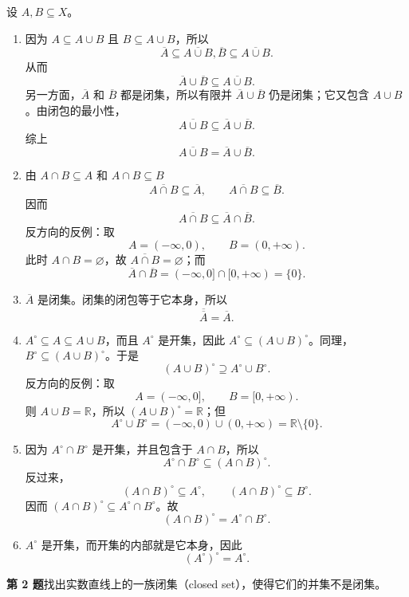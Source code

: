\documentclass[UTF8,a4paper,11pt,fontset=windows]{ctexart}
\newcommand{\R}{\mathbb R}
\newcommand{\problem}[1]{\par\addvspace{10pt}\textbf{第 #1 题}\quad}
\begin{document}
设 $A,B\subseteq X$。
\begin{enumerate}
  \item 因为 $A\subseteq A\cup B$ 且 $B\subseteq A\cup B$，所以
    \[
    \overline A\subseteq\overline{A\cup B},\overline B\subseteq\overline{A\cup B}.
  \]
  从而
  \[
    \overline A\cup\overline B\subseteq\overline{A\cup B}.
  \]
  另一方面，$\overline A$ 和 $\overline B$ 都是闭集，所以有限并 $\overline A\cup\overline B$ 仍是闭集；它又包含 $A\cup B$。由闭包的最小性，
  \[
    \overline{A\cup B}\subseteq\overline A\cup\overline B.
  \]
综上
  \[
    \overline{A\cup B}=\overline A\cup\overline B.
  \]

  \item 由 $A\cap B\subseteq A$ 和 $A\cap B\subseteq B$
  \[
    \overline{A\cap B}\subseteq\overline A,
    \qquad
    \overline{A\cap B}\subseteq\overline B.
  \]
  因而
  \[
    \overline{A\cap B}\subseteq\overline A\cap\overline B.
  \]
反方向的反例：取
  \[
    A=(-\infty,0),\qquad B=(0,+\infty).
  \]
  此时 $A\cap B=\varnothing$，故 $\overline{A\cap B}=\varnothing$；而
  \[
    \overline A\cap\overline B=(-\infty,0]\cap[0,+\infty)=\{0\}.
  \]

  \item $\overline A$ 是闭集。闭集的闭包等于它本身，所以
  \[
    \overline{\overline A}=\overline A.
  \]

  \item $A^\circ\subseteq A\subseteq A\cup B$，而且 $A^\circ$ 是开集，因此 $A^\circ\subseteq(A\cup B)^\circ$。同理，$B^\circ\subseteq(A\cup B)^\circ$。于是
  \[
    (A\cup B)^\circ\supseteq A^\circ\cup B^\circ.
  \]
反方向的反例：取
  \[
    A=(-\infty,0],\qquad B=[0,+\infty).
  \]
  则 $A\cup B=\R$，所以 $(A\cup B)^\circ=\R$；但
  \[
    A^\circ\cup B^\circ=(-\infty,0)\cup(0,+\infty)=\R\setminus\{0\}.
  \]

  \item 因为 $A^\circ\cap B^\circ$ 是开集，并且包含于 $A\cap B$，所以
  \[
    A^\circ\cap B^\circ\subseteq(A\cap B)^\circ.
  \]
  反过来，
  \[
    (A\cap B)^\circ\subseteq A^\circ,
    \qquad
    (A\cap B)^\circ\subseteq B^\circ.
  \]
  因而 $(A\cap B)^\circ\subseteq A^\circ\cap B^\circ$。故
  \[
    (A\cap B)^\circ=A^\circ\cap B^\circ.
  \]

  \item $A^\circ$ 是开集，而开集的内部就是它本身，因此
  \[
    (A^\circ)^\circ=A^\circ.
  \]
\end{enumerate}




\problem{2}找出实数直线上的一族闭集（closed set），使得它们的并集不是闭集。
\end{document}
